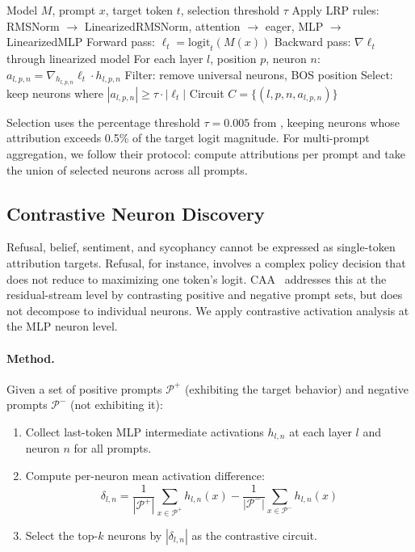 \documentclass[11pt]{article}
\begin{document}
\begin{algorithm}[htbp]
\caption{Neuron Circuit Discovery via RelP~\citep{arora2025circuits}}
\label{alg:discovery}
\begin{algorithmic}[1]
\REQUIRE Model $M$, prompt $x$, target token $t$, selection threshold $\tau$
\STATE Apply LRP rules: RMSNorm $\to$ LinearizedRMSNorm, attention $\to$ eager, MLP $\to$ LinearizedMLP
\STATE Forward pass: $\ell_t = \text{logit}_t(M(x))$
\STATE Backward pass: $\nabla \ell_t$ through linearized model
\STATE For each layer $l$, position $p$, neuron $n$: $a_{l,p,n} = \nabla_{h_{l,p,n}} \ell_t \cdot h_{l,p,n}$
\STATE Filter: remove universal neurons, BOS position
\STATE Select: keep neurons where $|a_{l,p,n}| \geq \tau \cdot |\ell_t|$
\RETURN Circuit $C = \{(l, p, n, a_{l,p,n})\}$
\end{algorithmic}
\end{algorithm}

\noindent
Selection uses the percentage threshold $\tau = 0.005$ from \citet{arora2025circuits}, keeping neurons whose attribution exceeds 0.5\% of the target logit magnitude.
For multi-prompt aggregation, we follow their protocol: compute attributions per prompt and take the union of selected neurons across all prompts.

\subsection{Contrastive Neuron Discovery}
\label{sec:contrastive}

Refusal, belief, sentiment, and sycophancy cannot be expressed as single-token attribution targets.
Refusal, for instance, involves a complex policy decision that does not reduce to maximizing one token's logit.
CAA~\citep{rimsky2024steering} addresses this at the residual-stream level by contrasting positive and negative prompt sets, but does not decompose to individual neurons.
We apply contrastive activation analysis at the MLP neuron level.

\paragraph{Method.}
Given a set of positive prompts $\mathcal{P}^+$ (exhibiting the target behavior) and negative prompts $\mathcal{P}^-$ (not exhibiting it):

\begin{enumerate}[leftmargin=2em]
    \item Collect last-token MLP intermediate activations $h_{l,n}$ at each layer $l$ and neuron $n$ for all prompts.
    \item Compute per-neuron mean activation difference:
    \begin{equation}
        \delta_{l,n} = \frac{1}{|\mathcal{P}^+|} \sum_{x \in \mathcal{P}^+} h_{l,n}(x) - \frac{1}{|\mathcal{P}^-|} \sum_{x \in \mathcal{P}^-} h_{l,n}(x)
        \label{eq:contrastive}
    \end{equation}
    \item Select the top-$k$ neurons by $|\delta_{l,n}|$ as the contrastive circuit.
\end{enumerate}
\end{document}
